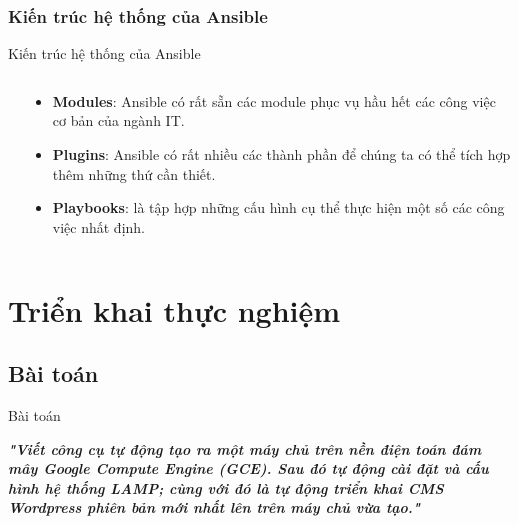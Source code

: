 \documentclass[14pt]{beamer}
\begin{document}
\subsubsection*{Kiến trúc hệ thống của Ansible}
\begin{frame}{Kiến trúc hệ thống của Ansible}
\setlength{\topsep}{0pt}
\begin{columns}
\begin{column}{0.75\textwidth}
    \begin{center}
    \end{center}
\end{column}
\hfill
\begin{column}{0.38\textwidth}
\begin{scriptsize}
\begin{itemize}
\item \textbf{Modules}: Ansible có rất sẵn các module phục vụ hầu hết các công việc cơ bản của ngành IT.
\pause
\item \textbf{Plugins}: Ansible có rất nhiều các thành phần để chúng ta có thể tích hợp thêm những thứ cần thiết.
\pause
\item \textbf{Playbooks}: là tập hợp những cấu hình cụ thể thực hiện một số các công việc nhất định.
\end{itemize}
\end{scriptsize}
\end{column}
\end{columns}
\end{frame}

\section{Triển khai thực nghiệm}
\subsection{Bài toán}
\begin{frame}{Bài toán}
\renewcommand{\baselinestretch}{1.50}\normalsize
  \begin{alertblock}\justifying
    \emph{\textbf{"Viết công cụ tự động tạo ra một máy chủ trên nền điện toán đám mây Google Compute Engine (GCE). Sau đó tự động cài đặt và cấu hình hệ thống LAMP; cùng với đó là tự động triển khai CMS Wordpress phiên bản mới nhất lên trên máy chủ vừa tạo."}}
  \end{alertblock}
\renewcommand{\baselinestretch}{1.0}\normalsize
\end{frame}
\end{document}
